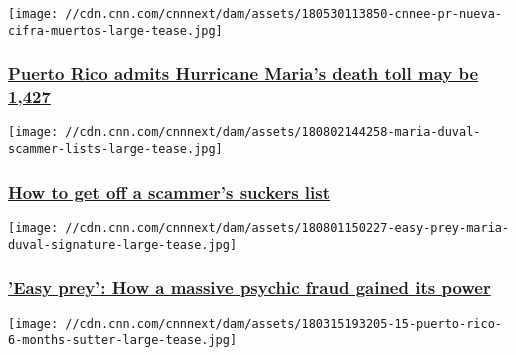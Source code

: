 \href{/2018/08/09/health/death-toll-maria-1427-update/index.html}{}

\texttt{[image: //cdn.cnn.com/cnnnext/dam/assets/180530113850-cnnee-pr-nueva-cifra-muertos-large-tease.jpg]}

\hypertarget{puerto-rico-admits-hurricane-marias-death-toll-may-be-1427}{%
\subsubsection{\texorpdfstring{\href{/2018/08/09/health/death-toll-maria-1427-update/index.html}{Puerto
Rico admits Hurricane Maria's death toll may be
1,427}}{Puerto Rico admits Hurricane Maria's death toll may be 1,427}}\label{puerto-rico-admits-hurricane-marias-death-toll-may-be-1427}}

\href{/2018/08/07/world/data-broker-suckers-lists-invs/index.html}{}

\texttt{[image: //cdn.cnn.com/cnnnext/dam/assets/180802144258-maria-duval-scammer-lists-large-tease.jpg]}

\hypertarget{how-to-get-off-a-scammers-suckers-list}{%
\subsubsection{\texorpdfstring{\href{/2018/08/07/world/data-broker-suckers-lists-invs/index.html}{How
to get off a scammer's suckers
list}}{How to get off a scammer's suckers list}}\label{how-to-get-off-a-scammers-suckers-list}}

\href{/2018/08/07/world/deal-with-the-devil-book-invs/index.html}{}

\texttt{[image: //cdn.cnn.com/cnnnext/dam/assets/180801150227-easy-prey-maria-duval-signature-large-tease.jpg]}

\hypertarget{easy-prey-how-a-massive-psychic-fraud-gained-its-power}{%
\subsubsection{\texorpdfstring{\href{/2018/08/07/world/deal-with-the-devil-book-invs/index.html}{'Easy
prey': How a massive psychic fraud gained its
power}}{'Easy prey': How a massive psychic fraud gained its power}}\label{easy-prey-how-a-massive-psychic-fraud-gained-its-power}}

\href{/2018/08/02/health/jama-excess-death-hurricane-maria-invs/index.html}{}

\texttt{[image: //cdn.cnn.com/cnnnext/dam/assets/180315193205-15-puerto-rico-6-months-sutter-large-tease.jpg]}

